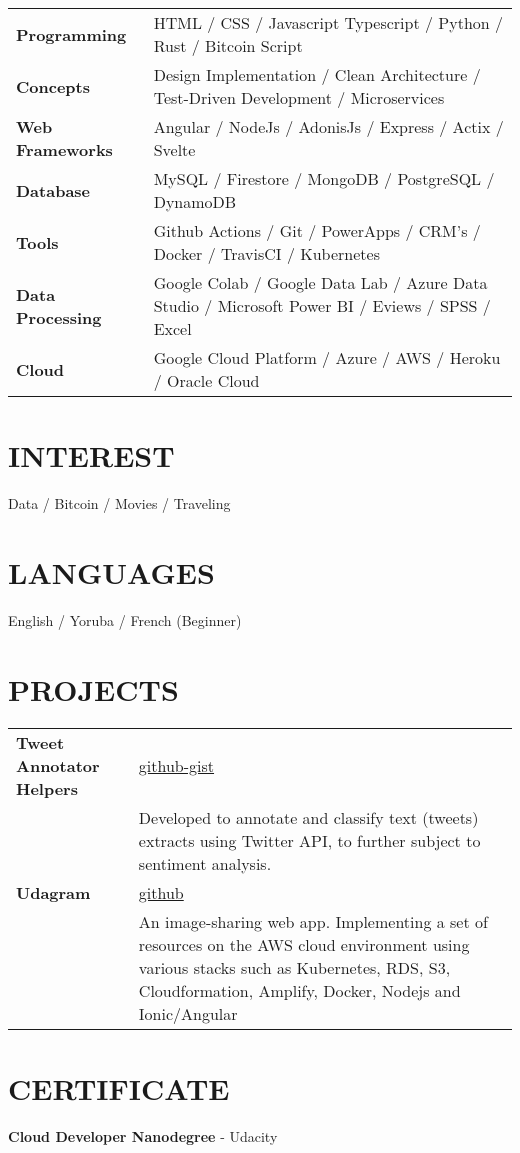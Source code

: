 \documentclass[a4paper,12pt]{article}
\begin{document}
\begin{tabularx}{\linewidth}{@{}l X@{}}
\textbf{Programming} & HTML / CSS / Javascript Typescript / Python / Rust / Bitcoin Script \\
\textbf{Concepts} & Design Implementation / Clean Architecture / Test-Driven Development / Microservices \\
\textbf{Web Frameworks} & Angular / NodeJs / AdonisJs / Express / Actix / Svelte \\
\textbf{Database} & MySQL / Firestore / MongoDB / PostgreSQL / DynamoDB \\
\textbf{Tools} & Github Actions / Git / PowerApps / CRM's / Docker / TravisCI / Kubernetes \\
\textbf{Data Processing} & Google Colab / Google Data Lab / Azure Data Studio / Microsoft Power BI / Eviews / SPSS / Excel \\
\textbf{Cloud} & Google Cloud Platform / Azure / AWS / Heroku / Oracle Cloud
\end{tabularx}

\section{INTEREST}
Data / Bitcoin / Movies / Traveling

\section{LANGUAGES}
English / Yoruba / French (Beginner)

\section{PROJECTS}

\begin{tabularx}{\linewidth}{@{}l X@{}}
\textbf{Tweet Annotator Helpers} & \hfill \href{https://github-gist.com}{github-gist} \\
& Developed to annotate and classify text (tweets) extracts using Twitter API, to further subject to sentiment analysis. \\[10pt]
\textbf{Udagram} & \hfill \href{https://github.com}{github} \\
& An image-sharing web app. Implementing a set of resources on the AWS cloud environment using various stacks such as Kubernetes, RDS, S3, Cloudformation, Amplify, Docker, Nodejs and Ionic/Angular
\end{tabularx}

\section{CERTIFICATE}
\textbf{Cloud Developer Nanodegree} - Udacity

\vfill
{}
\end{document}
